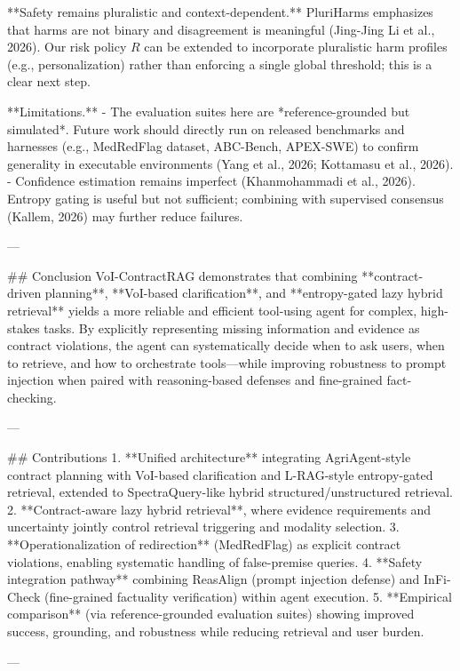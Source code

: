 **Safety remains pluralistic and context-dependent.** PluriHarms emphasizes that harms are not binary and disagreement is meaningful (Jing-Jing Li et al., 2026). Our risk policy \(R\) can be extended to incorporate pluralistic harm profiles (e.g., personalization) rather than enforcing a single global threshold; this is a clear next step.

**Limitations.**
- The evaluation suites here are *reference-grounded but simulated*. Future work should directly run on released benchmarks and harnesses (e.g., MedRedFlag dataset, ABC-Bench, APEX-SWE) to confirm generality in executable environments (Yang et al., 2026; Kottamasu et al., 2026).
- Confidence estimation remains imperfect (Khanmohammadi et al., 2026). Entropy gating is useful but not sufficient; combining with supervised consensus (Kallem, 2026) may further reduce failures.

---

## Conclusion
VoI-ContractRAG demonstrates that combining **contract-driven planning**, **VoI-based clarification**, and **entropy-gated lazy hybrid retrieval** yields a more reliable and efficient tool-using agent for complex, high-stakes tasks. By explicitly representing missing information and evidence as contract violations, the agent can systematically decide when to ask users, when to retrieve, and how to orchestrate tools—while improving robustness to prompt injection when paired with reasoning-based defenses and fine-grained fact-checking.

---

## Contributions
1. **Unified architecture** integrating AgriAgent-style contract planning with VoI-based clarification and L-RAG-style entropy-gated retrieval, extended to SpectraQuery-like hybrid structured/unstructured retrieval.
2. **Contract-aware lazy hybrid retrieval**, where evidence requirements and uncertainty jointly control retrieval triggering and modality selection.
3. **Operationalization of redirection** (MedRedFlag) as explicit contract violations, enabling systematic handling of false-premise queries.
4. **Safety integration pathway** combining ReasAlign (prompt injection defense) and InFi-Check (fine-grained factuality verification) within agent execution.
5. **Empirical comparison** (via reference-grounded evaluation suites) showing improved success, grounding, and robustness while reducing retrieval and user burden.

---